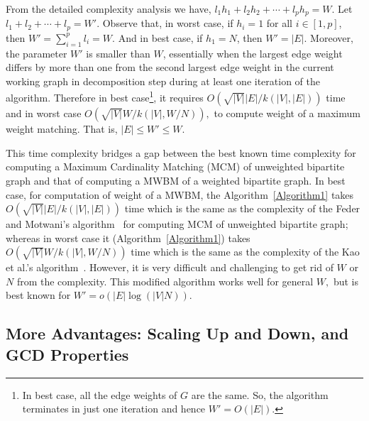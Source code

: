 \documentclass[runningheads,a4paper]{llncs}
\begin{document}
From the detailed complexity analysis we have,  $l_1h_1+l_2h_2+ \cdots + l_ph_p=W.$ Let $l_1+l_2+ \cdots + l_p=W'.$ Observe that, in worst case, if
$h_i=1$ for all $i \in [1,p]$, then $W'=\sum_{i=1}^p l_i=W.$ And in best case, if $h_1=N$, then $W'=|E|$. 
Moreover, the parameter $W'$ is smaller than $W$,
 essentially when the largest edge weight differs by more than one from the
second largest edge weight in the current working graph in  decomposition step
during at least one iteration of the algorithm. Therefore  in best case\footnote{
In best case, all the edge weights of $G$ are the same. So, the algorithm terminates
in just one iteration and hence $W'=O(|E|).$}, it
requires $O(\sqrt{|V|}|E|/k(|V|,|E|))$ time 
and in worst case $O(\sqrt{|V|}W/k(|V|,W/{N})),$  to compute weight of a maximum weight matching. That is,  $|E| \leq W' \leq W$.








This time complexity bridges a gap between the best known time complexity for computing a 
Maximum Cardinality Matching (MCM) of unweighted bipartite graph and that of computing a MWBM of a weighted bipartite graph.
In best case, for computation of weight of a MWBM, the Algorithm~\ref{Algorithm1} takes 
$O(\sqrt{|V|}|E|/k(|V|,|E|))$ time which is the same as the complexity of the Feder and Motwani's algorithm~\cite{feder95} for computing MCM of unweighted bipartite graph;  whereas
in worst case it (Algorithm~\ref{Algorithm1}) takes $O(\sqrt{|V|}W/k(|V|,W/{N}))$ time which is the same as the complexity of the Kao et al.'s algorithm~\cite{kao02}.
However, it is very difficult and challenging to get rid of $W$ or $N$ from the complexity.
This modified algorithm works well for general $W,$ but is best known for
$W'=o(|E| \log(|V|N))$.



\subsection{More Advantages: Scaling Up and Down, and GCD Properties}
\end{document}
